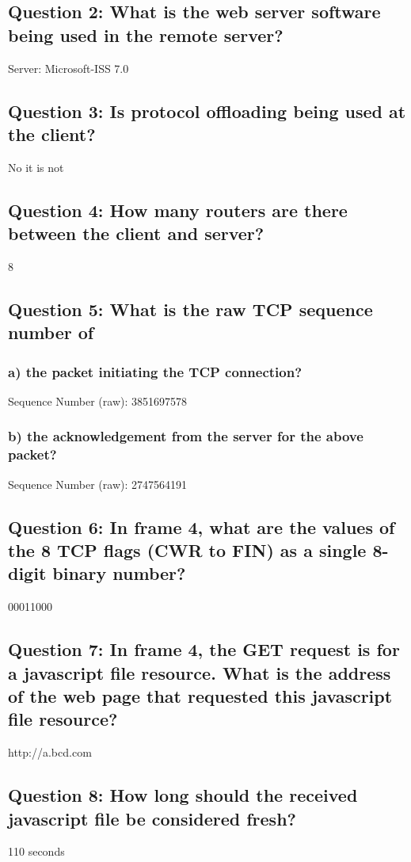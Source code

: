 \documentclass[11pt, oneside, a4paper]{article}
\begin{document}
\subsection*{Question 2: What is the web server software being used in the remote server?}
Server: Microsoft-ISS 7.0

\subsection*{Question 3: Is protocol offloading being used at the client?}
No it is not

\subsection*{Question 4: How many routers are there between the client and server?}
8

\subsection*{Question 5: What is the raw TCP sequence number of}

  \subsubsection*{a) the packet initiating the TCP connection?}
  Sequence Number (raw): 3851697578
  \subsubsection*{b) the acknowledgement from the server for the above packet?}
  Sequence Number (raw): 2747564191

\subsection*{Question 6: In frame 4, what are the values of the 8 TCP flags (CWR to FIN) as a single 8-digit binary number?}
00011000

\subsection*{Question 7: In frame 4, the GET request is for a javascript file resource. What is the address of the web page that requested this javascript file resource?}
http://a.bcd.com

\subsection*{Question 8: How long should the received javascript file be considered fresh?}
110 seconds
\end{document}
